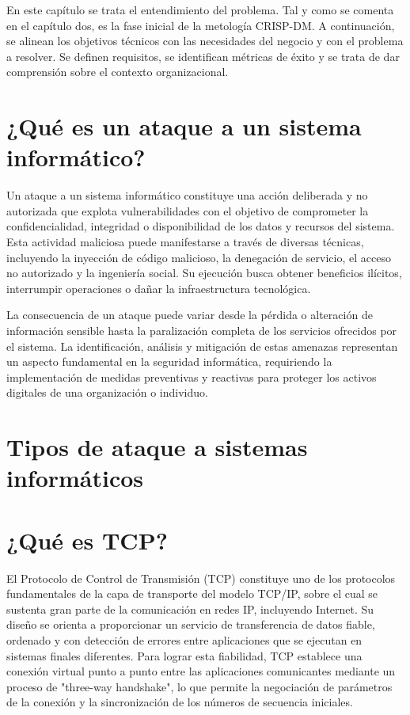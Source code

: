 En este capítulo se trata el entendimiento del problema. Tal y como se comenta en el capítulo dos, es la fase inicial de la metología CRISP-DM. A continuación, se alinean los objetivos técnicos con las necesidades del negocio y con el problema a resolver. Se definen requisitos, se identifican métricas de éxito y se trata de dar comprensión sobre el contexto organizacional.


\section{¿Qué es un ataque a un sistema informático?}
Un ataque a un sistema informático constituye una acción deliberada y no autorizada que explota vulnerabilidades con el objetivo de comprometer la confidencialidad, integridad o disponibilidad de los datos y recursos del sistema. Esta actividad maliciosa puede manifestarse a través de diversas técnicas, incluyendo la inyección de código malicioso, la denegación de servicio, el acceso no autorizado y la ingeniería social. Su ejecución busca obtener beneficios ilícitos, interrumpir operaciones o dañar la infraestructura tecnológica.

La consecuencia de un ataque puede variar desde la pérdida o alteración de información sensible hasta la paralización completa de los servicios ofrecidos por el sistema. La identificación, análisis y mitigación de estas amenazas representan un aspecto fundamental en la seguridad informática, requiriendo la implementación de medidas preventivas y reactivas para proteger los activos digitales de una organización o individuo.

\section{Tipos de ataque a sistemas informáticos}


\section{¿Qué es TCP?}

El Protocolo de Control de Transmisión (TCP) constituye uno de los protocolos fundamentales de la capa de transporte del modelo TCP/IP, sobre el cual se sustenta gran parte de la comunicación en redes IP, incluyendo Internet. Su diseño se orienta a proporcionar un servicio de transferencia de datos fiable, ordenado y con detección de errores entre aplicaciones que se ejecutan en sistemas finales diferentes. Para lograr esta fiabilidad, TCP establece una conexión virtual punto a punto entre las aplicaciones comunicantes mediante un proceso de "three-way handshake", lo que permite la negociación de parámetros de la conexión y la sincronización de los números de secuencia iniciales.

